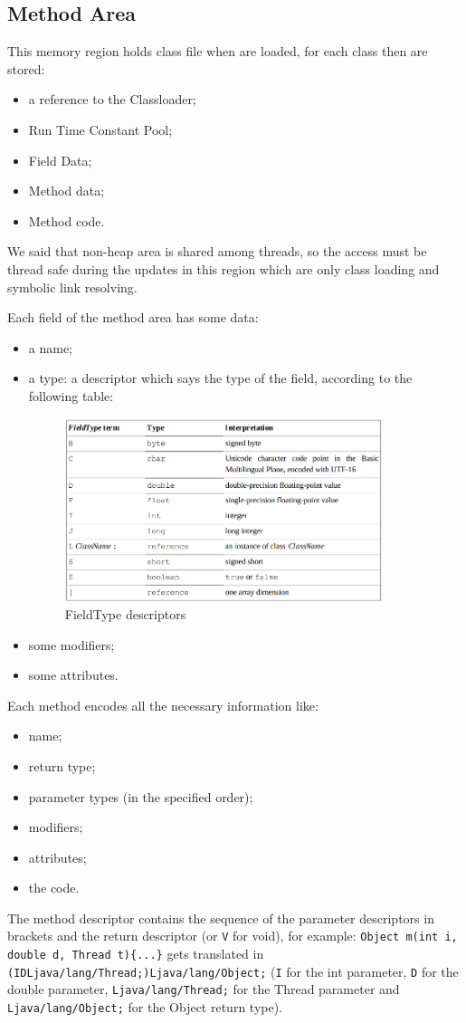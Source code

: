 \subsection{Method Area}
This memory region holds class file when are loaded, for each class then are stored:
\begin{itemize}
    \item a reference to the Classloader;
    \item Run Time Constant Pool;
    \item Field Data;
    \item Method data;
    \item Method code.
\end{itemize}
We said that non-heap area is shared among threads, so the access must be thread safe during the updates in this region which are only class loading and symbolic link resolving.

Each field of the method area has some data:
\begin{itemize}
    \item a name;
    \item a type: a descriptor which says the type of the field, according to the following table:
    \begin{figure}[H]
        \centering
        \includegraphics[width=350px]{images/2_JVM/fieldtype_descriptors.png}
        \caption{FieldType descriptors}
    \end{figure}
    \item some modifiers;
    \item some attributes.
\end{itemize}

Each method encodes all the necessary information like:
\begin{itemize}
    \item name;
    \item return type;
    \item parameter types (in the specified order);
    \item modifiers;
    \item attributes;
    \item the code.
\end{itemize}
The method descriptor contains the sequence of the parameter descriptors in brackets and the return descriptor (or \verb|V| for void), for example: \verb|Object m(int i, double d, Thread t){...}| gets translated in \verb|(IDLjava/lang/Thread;)Ljava/lang/Object;| (\verb|I| for the int parameter, \verb|D| for the double parameter, \verb|Ljava/lang/Thread;| for the Thread parameter and \verb|Ljava/lang/Object;| for the Object return type).



